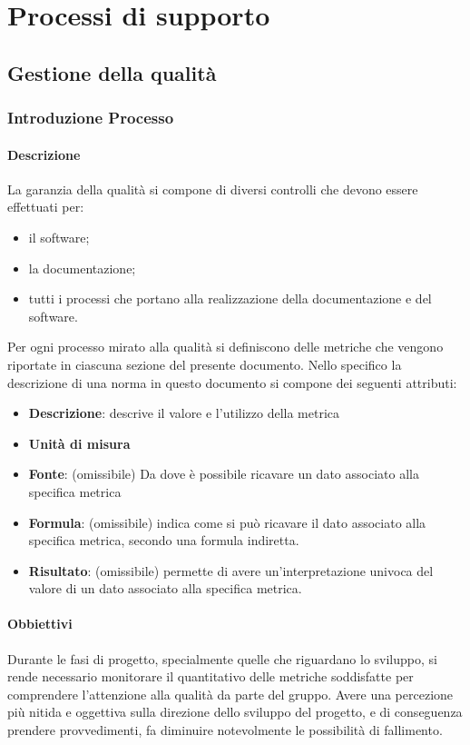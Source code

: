\section{Processi di supporto}
	\subsection{Gestione della qualità}
		\subsubsection{Introduzione Processo}
			\paragraph{Descrizione}
				La garanzia della qualità si compone di diversi controlli che devono essere effettuati per:
				\begin{itemize}
					\item il software;
					\item la documentazione;
					\item tutti i processi che portano alla realizzazione della documentazione e del software.
				\end{itemize}
				Per ogni processo mirato alla qualità si definiscono delle metriche che vengono riportate in ciascuna sezione del presente documento. Nello specifico la descrizione di una norma in questo documento si compone dei seguenti attributi:
				\begin{itemize}
					\item\textbf{Descrizione}: descrive il valore e l’utilizzo della metrica
					\item\textbf{Unità di misura}
					\item\textbf{Fonte}: (omissibile) Da dove è possibile ricavare un dato associato alla specifica metrica	
					\item\textbf{Formula}: (omissibile) indica come si può ricavare il dato associato alla specifica metrica, secondo una formula indiretta.
					\item\textbf{Risultato}: (omissibile) permette di avere un’interpretazione univoca del valore di un dato associato alla specifica metrica.
				\end{itemize}
			\paragraph{Obbiettivi}
				Durante le fasi di progetto, specialmente quelle che riguardano lo sviluppo, si rende necessario monitorare il quantitativo delle metriche soddisfatte per comprendere l'attenzione alla qualità da parte del gruppo. Avere una percezione più nitida e oggettiva sulla direzione dello sviluppo del progetto, e di conseguenza prendere provvedimenti, fa diminuire notevolmente le possibilità di fallimento.
